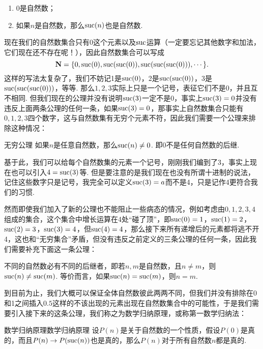 \begin{axiom}{}{}
    \begin{enumerate}
        \item 0是自然数；

        \item 如果$n$是自然数，那么$\operatorname{suc}(n)$也是自然数.
    \end{enumerate}
\end{axiom}

现在我们的自然数集合只有0这个元素以及$\operatorname{suc}$运算（一定要忘记其他数字和加法，它们现在还不存在呢！），因此自然数集合可以写成
\[\mathbf{N}=\{0,\operatorname{suc}(0),\operatorname{suc}(\operatorname{suc}(0)),\operatorname{suc}(\operatorname{suc}(\operatorname{suc}(0))),\cdots\}.\]
这样的写法太复杂了，我们不妨记1是$\operatorname{suc}(0)$，2是$\operatorname{suc}(\operatorname{suc}(0))$，3是$\operatorname{suc}(\operatorname{suc}(\operatorname{suc}(0)))$，等等. 那么$1,2,3$实际上只是一个记号，表征它们不是0，并且互不相同. 但我们现在的公理并没有说明$\operatorname{suc}(3)$一定不是0，事实上$\operatorname{suc}(3)=0$并没有违反上面两条公理的任何一条，如果$\operatorname{suc}(3)=0$，那事实上自然数集合只能有$0,1,2,3$四个数字，这与自然数集有无穷个元素不符，因此我们需要一个公理来排除这种情况：

\begin{axiom}{无穷公理}{}
    如果$n$是任意自然数，那么$\operatorname{suc}(n)\neq 0$. 即0不是任何自然数的后继.
\end{axiom}

基于此，我们可以给每个自然数集的元素一个记号，刚刚我们编到了3，事实上现在也可以引入$4=\operatorname{suc}(3)$等. 但是要注意的是我们现在也没有所谓十进制的说法，记住这些数字只是记号，我完全可以定义$\operatorname{suc}(3)=a$而不是4，只是记作4更符合我们的习惯.

然而即使我们加入了新的公理也不能阻止一些病态的情况，例如考虑由$0,1,2,3,4$组成的集合，这个集合中增长运算在4处``碰了顶''，即$\operatorname{suc}(0)=1$，$\operatorname{suc}(1)=2$，$\operatorname{suc}(2)=3$，$\operatorname{suc}(3)=4$，但$\operatorname{suc}(4)=4$，那么接下来所有递增后的元素都将逃不开4，这也和``无穷集合''矛盾，但没有违反之前定义的三条公理的任何一条，因此我们需要补充下面这一条公理：

\begin{axiom}{}{}
    不同的自然数必有不同的后继者，即若$n,m$是自然数，且$n\neq m$，则$\operatorname{suc}(n)\neq \operatorname{suc}(m)$. 等价而言，如果$\operatorname{suc}(n)=\operatorname{suc}(m)$，则$n=m$.
\end{axiom}

到目前为止，我们大概可以保证全体自然数彼此两两不同，但我们并没有排除在0和1之间插入$0.5$这样的不该出现的元素出现在自然数集合中的可能性，于是我们需要引入接下来的这条公理，我们称之为数学归纳原理，或称第一数学归纳法：

\begin{axiom}{数学归纳原理}{数学归纳原理}
    设$P(n)$是关于自然数的一个性质，假设$P(0)$是真的，而且$P(n) \rightarrow P(\operatorname{suc}(n))$也是真的，那么$P(n)$对于所有自然数$n$都是真的.
\end{axiom}

